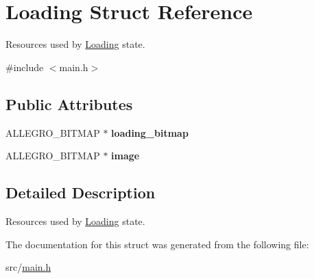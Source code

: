 \hypertarget{structLoading}{\section{\-Loading \-Struct \-Reference}
\label{structLoading}
}


\-Resources used by \hyperlink{structLoading}{\-Loading} state.  




{\ttfamily \#include $<$main.\-h$>$}

\subsection*{\-Public \-Attributes}
\begin{DoxyCompactItemize}
\item 
\hypertarget{structLoading_aa6c655f5a0c41583f9c1a547ca81b98b}{\-A\-L\-L\-E\-G\-R\-O\-\_\-\-B\-I\-T\-M\-A\-P $\ast$ {\bfseries loading\-\_\-bitmap}}\label{structLoading_aa6c655f5a0c41583f9c1a547ca81b98b}

\item 
\hypertarget{structLoading_aeb9282e47c1ddeb2188be15e34bddba8}{\-A\-L\-L\-E\-G\-R\-O\-\_\-\-B\-I\-T\-M\-A\-P $\ast$ {\bfseries image}}\label{structLoading_aeb9282e47c1ddeb2188be15e34bddba8}

\end{DoxyCompactItemize}


\subsection{\-Detailed \-Description}
\-Resources used by \hyperlink{structLoading}{\-Loading} state. 

\-The documentation for this struct was generated from the following file\-:\begin{DoxyCompactItemize}
\item 
src/\hyperlink{main_8h}{main.\-h}\end{DoxyCompactItemize}
